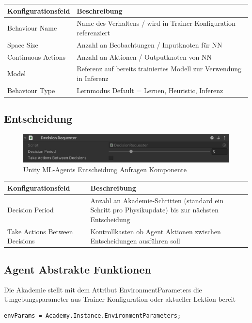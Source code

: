 \begin{center}
{
\begin{tabular}{ |p{4cm}|p{8cm}| }
\hline
Konfigurationsfeld& Beschreibung \\
\hline
Behaviour Name & Name des Verhaltens / wird in Trainer Konfiguration referenziert \\
Space Size & Anzahl an Beobachtungen / Inputknoten für NN \\
Continuous Actions & Anzahl an Aktionen / Outputknoten von NN \\
Model & Referenz auf bereits trainiertes Modell zur Verwendung in Inferenz \\
Behaviour Type & Lernmodus Default = Lernen, Heuristic, Inferenz \\
\hline
\end{tabular}}
\end{center}

\subsection{Entscheidung}
\begin{figure}[H]
  \centering  
  \includegraphics[scale=0.5]{img/entscheidung_anfragen_komponente.png}
  \caption{Unity ML-Agents Entscheidung Anfragen Komponente}
  \label{fig:entscheidung_anfragen_komponente}
\end{figure}

\begin{center}
{
\begin{tabular}{ |p{4cm}|p{8cm}| }
\hline
Konfigurationsfeld& Beschreibung \\
\hline
Decision Period & Anzahl an Akademie-Schritten (standard ein Schritt pro Physikupdate) bis zur nächsten Entscheidung \\
Take Actions Between Decisions &  Kontrollkasten ob Agent Aktionen zwischen Entscheidungen ausführen soll \\
\hline
\end{tabular}}
\end{center}


\subsection{Agent Abstrakte Funktionen}
Die Akademie stellt mit dem Attribut EnvironmentParameters die Umgebungsparameter aus Trainer Konfiguration oder aktueller Lektion bereit
\begin{lstlisting}
envParams = Academy.Instance.EnvironmentParameters;
\end{lstlisting}

